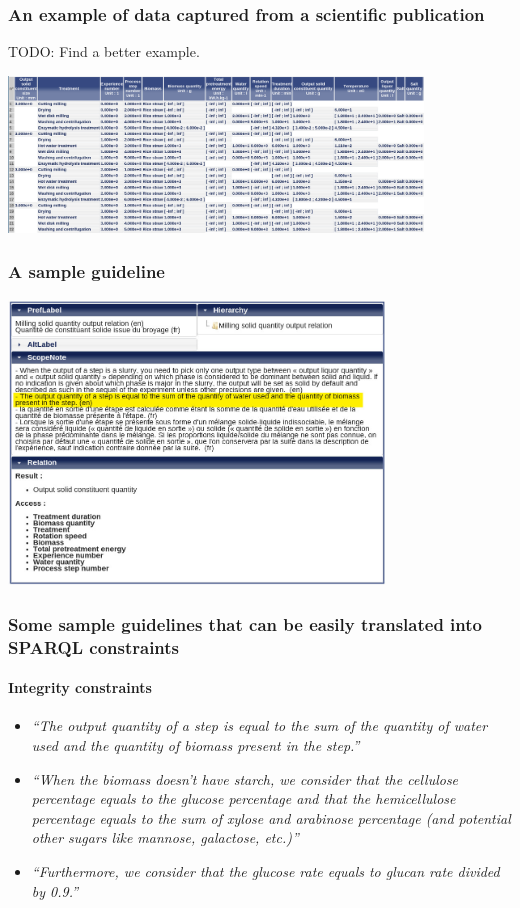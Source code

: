 \documentclass{beamer}
\begin{document}
\begin{frame}
  \frametitle{An example of data captured from a scientific publication}

  TODO: Find a better example.

  \begin{center}
    \includegraphics[width=11cm]{table.jpg}
  \end{center}
\end{frame}

\begin{frame}
  \frametitle{A sample guideline}

  \begin{center}
    \includegraphics[width=10cm]{guideline.jpg}
  \end{center}
\end{frame}

\begin{frame}
  \frametitle{Some sample guidelines that can be easily translated into SPARQL constraints}
  \framesubtitle{Integrity constraints}

  \begin{itemize}
    \item \textit{``The output quantity of a step is equal to the sum of the quantity of water used and the quantity of biomass present in the step.''}

    \pause

    \item \textit{``When the biomass doesn't have starch, we consider that the cellulose percentage equals to the glucose percentage and that the hemicellulose percentage equals to the sum of xylose and arabinose percentage (and potential other sugars like mannose, galactose, etc.)''}

    \pause

    \item \textit{``Furthermore, we consider that the glucose rate equals to glucan rate divided by 0.9.''}
  \end{itemize}
\end{frame}
\end{document}
